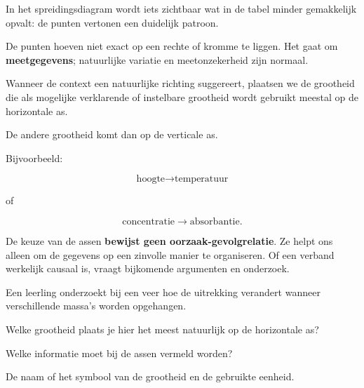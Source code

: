 \documentclass{ximera}
\begin{document}
In het spreidingsdiagram wordt iets zichtbaar wat in de tabel
minder gemakkelijk opvalt: de punten vertonen een duidelijk patroon.

De punten hoeven niet exact op een rechte of kromme te liggen.
Het gaat om \textbf{meetgegevens}; natuurlijke variatie en
meetonzekerheid zijn normaal.




Wanneer de context een natuurlijke richting suggereert, plaatsen we
de grootheid die als mogelijke verklarende of instelbare grootheid
wordt gebruikt meestal op de horizontale as.

De andere grootheid komt dan op de verticale as.

Bijvoorbeeld:

\[
\text{hoogte}
\longrightarrow
\text{temperatuur}
\]

of

\[
\text{concentratie}
\longrightarrow
\text{absorbantie}.
\]

\begin{opmerking}
De keuze van de assen \textbf{bewijst geen oorzaak-gevolgrelatie}.
Ze helpt ons alleen om de gegevens op een zinvolle manier te organiseren.
Of een verband werkelijk causaal is, vraagt bijkomende argumenten en
onderzoek.
\end{opmerking}


\begin{oefening}{\oefB \ESS}

Een leerling onderzoekt bij een veer hoe de uitrekking verandert
wanneer verschillende massa's worden opgehangen.

\begin{question}
Welke grootheid plaats je hier het meest natuurlijk op de horizontale as?

\begin{multipleChoice}
\end{multipleChoice}
\end{question}

\begin{question}
Welke informatie moet bij de assen vermeld worden?

\begin{oplossing}
De naam of het symbool van de grootheid en de gebruikte eenheid.
\end{oplossing}
\end{question}
\end{oefening}
\end{document}
